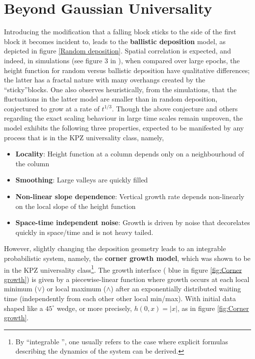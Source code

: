 \documentclass[12pt]{report}
\theoremstyle{plain}
\begin{document}
\section{Beyond Gaussian Universality}\label{sec: non-gaussian}

Introducing the modification that a falling block sticks to the side of the first block it becomes incident to, leads to the \textbf{ballistic deposition} model, as depicted in figure \ref{Random deposition}. Spatial correlation is expected, and indeed, in simulations (see figure $3$ in \cite{corwin2016kardar}), when compared over large epochs, the height function for random versus ballistic deposition have qualitative differences; the latter has a fractal nature with many overhangs created by the \textquotedblleft sticky\textquotedblright blocks. One also observes heuristically, from the simulations, that the fluctuations in the latter model are smaller than in random deposition, conjectured to grow at a rate of \(t^{1/3}\). Though the above conjecture and others regarding the exact scaling behaviour in large time scales remain unproven, the model exhibits the following three properties, expected to be manifested by any process that is in the KPZ universality class, namely, 

\begin{itemize}
    \item \textbf{Locality}: Height function at a column depends only on a neighbourhoud of the column
    \item \textbf{Smoothing}: Large valleys are quickly filled
    \item \textbf{Non-linear slope dependence}: Vertical growth rate depends non-linearly on the local slope of the height function
    \item \textbf{Space-time independent noise}: Growth is driven by noise that decorelates quickly in space/time and is not heavy tailed.
\end{itemize}

However, slightly changing the deposition geometry leads to an integrable probabilistic system, namely, the \textbf{corner growth model}, which was shown to be in the KPZ universality class\footnote{By \textquotedblleft  integrable \textquotedblright, one usually refers to the case where explicit formulas describing the dynamics of the system can be derived.}. The growth interface (\color{blue} blue \color{black} in figure \ref{fig:Corner growth}) is given by a piecewise-linear function where growth occurs at each local minimum (\(\lor\)) or local maximum (\(\land\)) after an exponentially distributed waiting time (independently from each other other local min/max). With initial data shaped like a \(45^{\circ}\) wedge, or more precisely, \(h(0,x) = |x|\), as in figure \ref{fig:Corner growth}.
\end{document}

